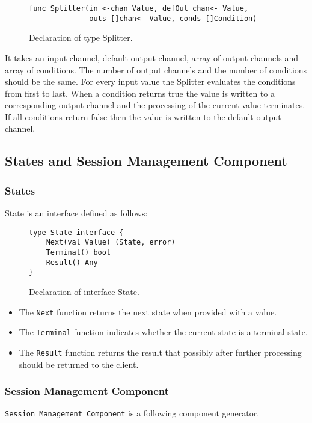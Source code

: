 \documentclass[12pt,a4paper]{article}
\begin{document}
\begin{figure}[h]
\centering
\begin{lstlisting}
func Splitter(in <-chan Value, defOut chan<- Value, 
			  outs []chan<- Value, conds []Condition)
\end{lstlisting}
\caption[scale=1.0]{Declaration of type Splitter.}
\label{fig:Splitter}
\end{figure}

It takes an input channel, default output channel, array of output channels and array of conditions.
The number of output channels and the number of conditions should be the same.
For every input value the Splitter evaluates the conditions from first to last.
When a condition returns true the value is written to a corresponding output channel 
and the processing of the current value terminates. If all conditions return false
then the value is written to the default output channel.

\subsection{States and Session Management Component}
\subsubsection{States}
State is an interface defined as follows:

\begin{figure}[h]
\centering
\begin{lstlisting}
type State interface {
    Next(val Value) (State, error)
    Terminal() bool
    Result() Any
}
\end{lstlisting}
\caption[scale=1.0]{Declaration of interface State.}
\label{fig:State}
\end{figure}

\begin{itemize}
	\item The \texttt{Next} function returns the next state when provided with a value.
	\item The \texttt{Terminal} function indicates whether the current state is a terminal state.
	\item The \texttt{Result} function returns the result that possibly after further 
		  processing should be returned to the client.
\end{itemize}

\subsubsection{Session Management Component}
\texttt{Session Management Component} is a following component generator.
\end{document}

